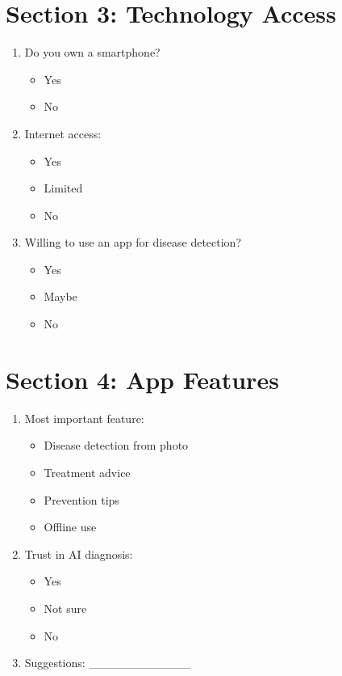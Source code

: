 \documentclass[12pt,a4paper]{article}
\begin{document}
\section*{Section 3: Technology Access}

\begin{enumerate}[start=7]

\item Do you own a smartphone?
\begin{itemize}
\item Yes
\item No
\end{itemize}

\item Internet access:
\begin{itemize}
\item Yes
\item Limited
\item No
\end{itemize}

\item Willing to use an app for disease detection?
\begin{itemize}
\item Yes
\item Maybe
\item No
\end{itemize}

\end{enumerate}

\section*{Section 4: App Features}

\begin{enumerate}[start=10]

\item Most important feature:
\begin{itemize}
\item Disease detection from photo
\item Treatment advice
\item Prevention tips
\item Offline use
\end{itemize}

\item Trust in AI diagnosis:
\begin{itemize}
\item Yes
\item Not sure
\item No
\end{itemize}

\item Suggestions: \_\_\_\_\_\_\_\_\_\_\_\_

\end{enumerate}
\end{document}
